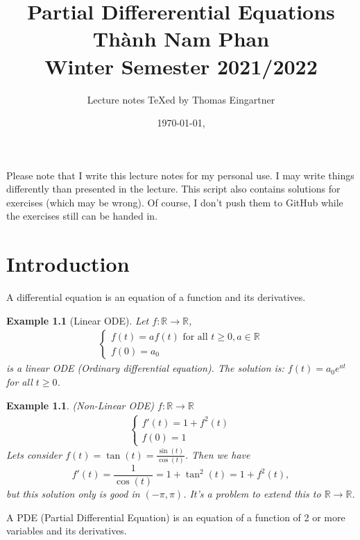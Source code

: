 \documentclass{report}
\title{Partial Differerential Equations \\ Thành Nam Phan \\ Winter Semester 2021/2022}
\author{Lecture notes \TeX{}ed by Thomas Eingartner}
\date{\today, \currenttime}
\theoremstyle{tommy}
\newtheorem{eg}[defn]{Example}
\begin{document}
  \maketitle
  \tableofcontents
  \newpage
  Please note that I write this lecture notes for my personal use. I may write things differently than presented in the lecture. This script also contains solutions for exercises (which may be wrong). Of course, I don't push them to GitHub while the exercises still can be handed in.
  \newpage

  \chapter{Introduction}

  A differential equation is an equation of a function and its derivatives. 

  \begin{eg}[Linear ODE]
    Let \(f: \mathbb{R} \to \mathbb{R}\),
    \begin{align*}
      \begin{cases}
        f(t) = a f(t) \text{ for all } t \ge 0, a \in \mathbb{R} \\
        f(0) = a_0
      \end{cases}
    \end{align*}
    is a linear ODE (Ordinary differential equation). The solution is: \(f(t) = a_0 e^{at}\) for all \(t \ge 0\).
  \end{eg}

  \begin{eg} (Non-Linear ODE) \(f: \mathbb{R} \to \mathbb{R}\)
    \begin{align*}
      \begin{cases}
        f'(t) = 1 + f^2(t) \\
        f(0) = 1
      \end{cases}
    \end{align*}
    Lets consider \(f(t) = \tan(t) = \frac{\sin(t)}{\cos(t)}\). Then we have \[f'(t) = \frac{1}{\cos(t)} = 1 + \tan^2(t) = 1 + f^2(t),\] but this solution only is \emph{good} in \((- \pi, \pi)\). It's a problem to extend this to \(\mathbb{R} \to \mathbb{R}\).
  \end{eg}

  A PDE (Partial Differential Equation) is an equation of a function of 2 or more variables and its derivatives.
\end{document}
